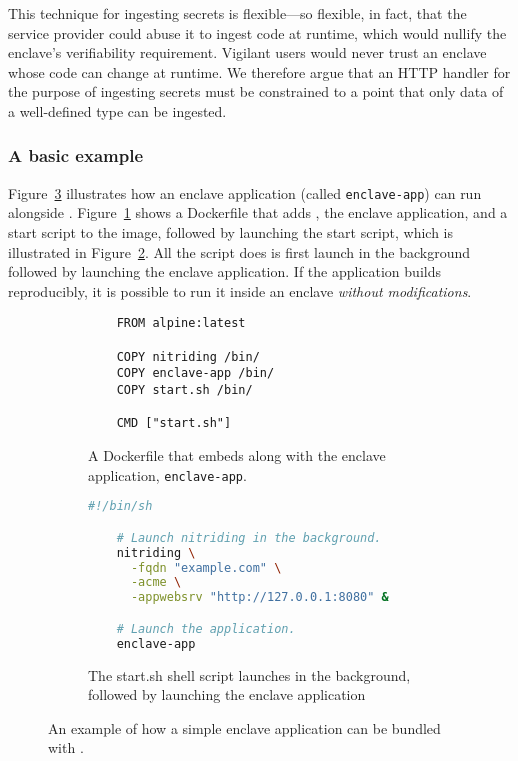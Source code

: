 This technique for ingesting secrets is flexible---so flexible, in fact, that
the service provider could abuse it to ingest code at runtime, which would
nullify the enclave's verifiability requirement.  Vigilant users would never
trust an enclave whose code can change at runtime.  We therefore argue that an
HTTP handler for the purpose of ingesting secrets must be constrained to a point
that only data of a well-defined type can be ingested.

\subsubsection{A basic example}
\label{sec:example}

Figure~\ref{fig:example} illustrates how an enclave application (called
\texttt{enclave-app}) can run alongside \tool{}.  Figure~\ref{fig:dockerfile}
shows a Dockerfile that adds \tool{}, the enclave application, and a start
script to the image, followed by launching the start script, which is
illustrated in Figure~\ref{fig:start}.  All the script does is first launch
\tool{} in the background followed by launching the enclave application.  If
the application builds reproducibly, it is possible to run it inside an enclave
\emph{without modifications}.

\begin{figure}[t]
  \begin{subfigure}[b]{\linewidth}
    \centering
    \begin{lstlisting}
    FROM alpine:latest

    COPY nitriding /bin/
    COPY enclave-app /bin/
    COPY start.sh /bin/

    CMD ["start.sh"]\end{lstlisting}
    \caption{A Dockerfile that embeds \tool{} along with the enclave
      application, \texttt{enclave-app}.}
    \label{fig:dockerfile}
  \end{subfigure}

  \begin{subfigure}[b]{\linewidth}
    \centering
    \begin{lstlisting}[language=bash]
    #!/bin/sh

    # Launch nitriding in the background.
    nitriding \
      -fqdn "example.com" \
      -acme \
      -appwebsrv "http://127.0.0.1:8080" &

    # Launch the application.
    enclave-app\end{lstlisting}
    \caption{The start.sh shell script launches \tool{} in the background,
    followed by launching the enclave application}
    \label{fig:start}
  \end{subfigure}

  \caption{An example of how a simple enclave application can be bundled with
  \tool.}
  \label{fig:example}
\end{figure}
